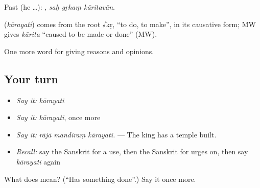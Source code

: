 Past (he …):   , \emph{saḥ gṛhaṃ kāritavān}.

\begin{cousinweb}
\textbf{} (\emph{kārayati}) comes from the root √kṛ, \textquotedblleft{}to do, to make\textquotedblright{}, in its causative form; MW gives \emph{kārita} \textquotedblleft{}caused to be made or done\textquotedblright{} (MW).
\end{cousinweb}

\begin{grammarlens}[title={What you've built}]
One more word for giving reasons and opinions.
\end{grammarlens}

\subsection*{Your turn}
\begin{itemize}
\raggedright
  \item \emph{Say it:} \emph{kārayati}
  \item \emph{Say it:} \emph{kārayati}, once more
  \item \emph{Say it:} \emph{rājā mandiraṃ kārayati.} — The king has a temple built.
  \item \emph{Recall:} say the Sanskrit for a use, then the Sanskrit for urges on, then say \emph{kārayati} again
\end{itemize}

\begin{tcolorbox}[breakable,colback=teal!4,colframe=teal!35!black,title={Before you move on}]
What does  mean? (\textquotedblleft{}Has something done\textquotedblright{}.) Say it once more.
\end{tcolorbox}

